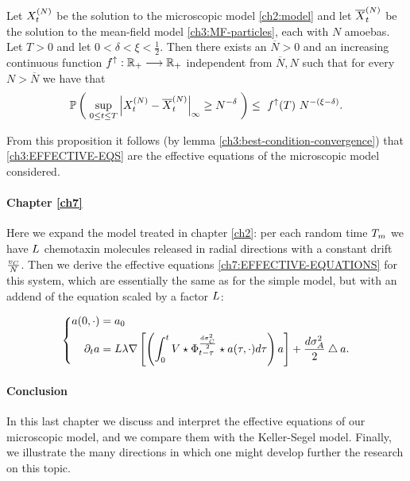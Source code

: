 \begin{proposition*}
	Let $X_t^{(N)}$ be the solution to the microscopic model \ref{ch2:model} and let $\overline{X}_t^{(N)}$ be the solution to the mean-field model \ref{ch3:MF-particles}, each with $N$ amoebas.
	Let $T > 0$ and let $0< \delta <\xi <\frac{1}{2}$.
	Then there exists an $\overline{N}>0$ and an increasing continuous function $f^\uparrow: \mathbb{R}_+ \longrightarrow \mathbb{R}_+$ independent from $\overline{N},N$ such that for every $N > \overline{N}$ we have that
	\begin{equation*}
		\mathbb{P} \left( \;   
			\sup_{0 \leq t \leq T}
			{ \left| 
				X_t^{(N)} - \overline{X}_t^{(N)}
			 \right|_{\infty} } 
			\geq
			N^{-\delta}
		 \; \right)
		\leq\
		f^\uparrow(T)\
		N^{-(\xi-\delta)}.
	\end{equation*}
\end{proposition*}
From this proposition it follows (by lemma \ref{ch3:best-condition-convergence}) that \ref{ch3:EFFECTIVE-EQS} are the effective equations of the microscopic model considered.

\paragraph{Chapter \ref{ch7}} Here we expand the model treated in chapter \ref{ch2}: per each random time $T_m$ we have $L$ chemotaxin molecules released in radial directions with a constant drift $\frac{v_C}{N}$.
Then we derive the effective equations \ref{ch7:EFFECTIVE-EQUATIONS} for this system, which are essentially the same as for the simple model, but with an addend of the equation scaled by a factor $L$:

\begin{equation}
	\left\{
	\begin{aligned}
		a(0, \cdot) &= a_0
		\\
		\partial_t a &=  L\lambda \nabla \left[ \left( \int_0^t
		V \star \Phi_{t-\tau}^{\frac{d\sigma_C^2}{2}} \star a(\tau, \cdot) 
		d \tau
		\right)
		a
		\right]
		+ \frac{d\sigma_A^2}{2} \bigtriangleup a.
	\end{aligned}
	\right.
\end{equation}


\paragraph{Conclusion} In this last chapter we discuss and interpret the effective equations of our microscopic model, and we compare them with the Keller-Segel model.
Finally, we illustrate the many directions in which one might develop further the research on this topic.